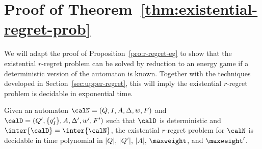 \documentclass[a4paper]{article}
\begin{document}
\section{Proof of Theorem~\ref{thm:existential-regret-prob}}
We will adapt the proof of Proposition~\ref{pro:r-regret-eg} to show that the
existential $r$-regret problem can be solved by reduction to an energy game if a
deterministic version of the automaton is known. Together with the techniques
developed in Section~\ref{sec:upper-regret}, this will imply the existential
$r$-regret problem is decidable in exponential time.

\begin{proposition}\label{pro:exist-regret-eg}
	Given an automaton $\calN = (Q,I,A,\Delta,w,F)$ and $\calD =
	(Q',\{q'_I\},A,\Delta',w',F')$ such that $\calD$ is deterministic and
	$\inter{\calD} = \inter{\calN}$, the existential $r$-regret problem for
	$\calN$ is decidable in time polynomial in $|Q|$, $|Q'|$,  $|A|$, 
	$\maxweight$, and $\maxweight'$.
\end{proposition}
\end{document}
